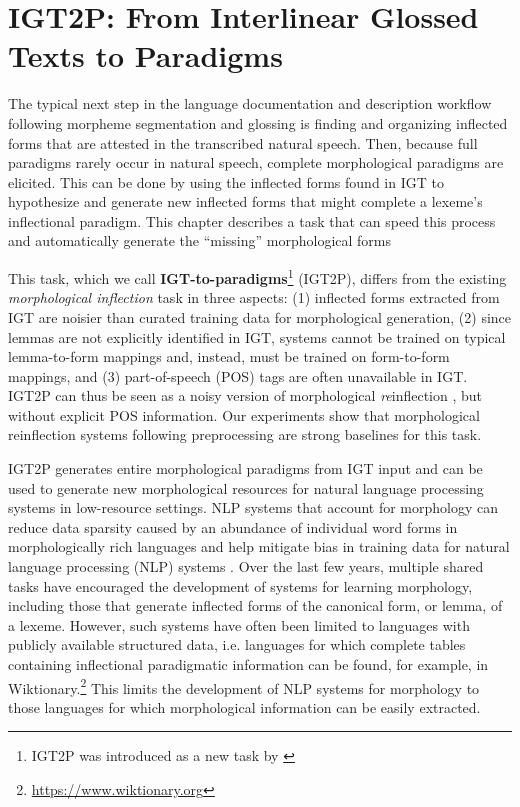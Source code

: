 \chapter{IGT2P: From Interlinear Glossed Texts to Paradigms}
\label{chap:IGT2P}


The typical next step in the language documentation and description workflow following morpheme segmentation and glossing is finding and organizing inflected forms that are attested in the transcribed natural speech. Then, because full paradigms rarely occur in natural speech, complete morphological paradigms are elicited. This can be done by using the inflected forms found in IGT to hypothesize and generate new inflected forms that might complete a lexeme's inflectional paradigm. This chapter describes a task that can speed this process and automatically generate the ``missing'' morphological forms

This task, which we call \textbf{IGT-to-paradigms}\footnote{IGT2P was introduced as a new task by \citet{moeller_igt2p_2020}} (IGT2P), differs from the existing \textit{morphological inflection} \citep{yarowsky-wicentowski-2000-minimally,faruqui-etal-2016-morphological} task in three aspects: (1) inflected forms extracted from IGT are noisier than curated training data for morphological generation, (2) since lemmas are not explicitly identified in IGT, systems cannot be trained on typical lemma-to-form mappings and, instead, must be trained on form-to-form mappings, and (3) part-of-speech (POS) tags are often unavailable in IGT. IGT2P can thus be seen as a noisy version of morphological \textit{re}inflection \citep{cotterell-etal-2016-sigmorphon}, but without explicit POS information. Our experiments show that morphological reinflection systems following preprocessing are strong baselines for this task. 

IGT2P generates entire morphological paradigms from IGT input and can be used to generate new morphological resources for natural language processing systems in low-resource settings. NLP systems that account for morphology can reduce data sparsity caused by an abundance of individual word forms in morphologically rich languages \citep{cotterell-etal-2016-sigmorphon,cotterell-etal-2017-conll,cotterell-etal-2018-conll,mccarthy-etal-2019-sigmorphon,vylomova2020sigmorphon} and help mitigate bias in training data for natural language processing (NLP) systems \citep{zmigrod-etal-2019-counterfactual}. Over the last few years, multiple shared tasks have encouraged the development of systems for learning morphology, including those that generate inflected forms of the canonical form, or lemma, of a lexeme.  However, such systems have often been limited to languages with publicly available structured data, i.e. languages for which complete tables containing inflectional paradigmatic information can be found, for example, in Wiktionary.\footnote{\url{https://www.wiktionary.org}} This limits the development of NLP systems for morphology to those languages for which morphological information can be easily extracted. 


